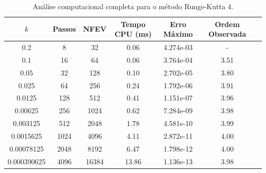 \begin{table}[H]
    \centering
    \begin{tabular}{ccccccc}
        \hline
        $k$ & Passos & NFEV & Tempo CPU (ms) & Erro Máximo & Ordem Observada \\
        \hline
        0.2 & 8 & 32 & 0.06  & 4.274e-03 & - \\
        0.1 & 16 & 64 & 0.06  & 3.764e-04 & 3.51 \\
        0.05 & 32 & 128 & 0.10  & 2.702e-05 & 3.80 \\
        0.025 & 64 & 256 & 0.24  & 1.792e-06 & 3.91 \\
        0.0125 & 128 & 512 & 0.41  & 1.151e-07 & 3.96 \\
        0.00625 & 256 & 1024 & 0.62  & 7.284e-09 & 3.98 \\
        0.003125 & 512 & 2048 & 1.78  & 4.581e-10 & 3.99 \\
        0.0015625 & 1024 & 4096 & 4.11  & 2.872e-11 & 4.00 \\
        0.00078125 & 2048 & 8192 & 6.47  & 1.798e-12 & 4.00 \\
        0.000390625 & 4096 & 16384 & 13.86  & 1.136e-13 & 3.98 \\
        \hline
    \end{tabular}
    \caption{Análise computacional completa para o método Runge-Kutta 4.}
    \label{tab:erros_runge-kutta_4}
\end{table}
